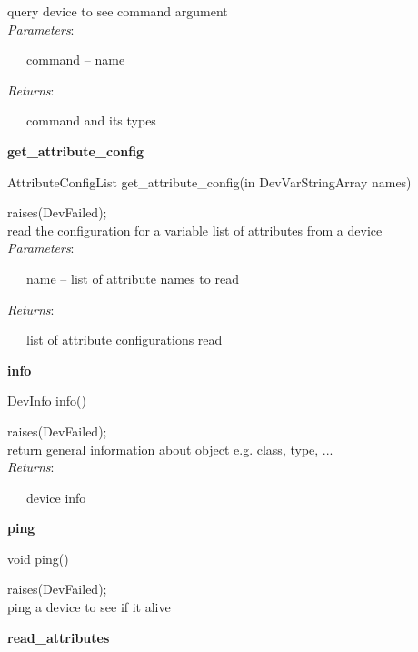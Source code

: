 query device to see command argument\\

\emph{Parameters}:

~~~command – name

\emph{Returns}:

~~~command and its types\\

\begin{flushleft}
\textbf{get\_attribute\_config}
\par\end{flushleft}

AttributeConfigList get\_attribute\_config(in DevVarStringArray names)

raises(DevFailed);\\

read the configuration for a variable list of attributes from a device\\

\emph{Parameters}:

~~~name – list of attribute names to read

\emph{Returns}:

~~~list of attribute configurations read\\

\begin{flushleft}
\textbf{info}
\par\end{flushleft}

DevInfo info()

raises(DevFailed);\\

return general information about object e.g. class, type, ...\\

\emph{Returns}:

~~~device info\\

\begin{flushleft}
\textbf{ping}
\par\end{flushleft}

void ping()

raises(DevFailed);\\

ping a device to see if it alive\\

\begin{flushleft}
\textbf{read\_attributes}
\par\end{flushleft}

